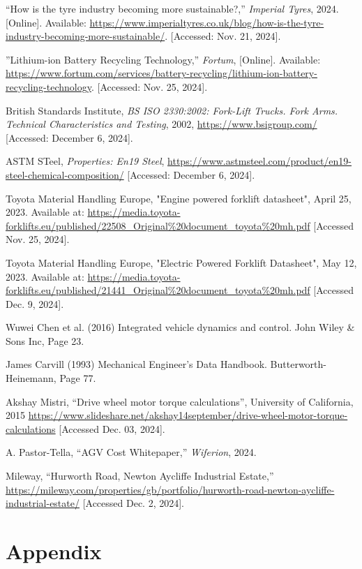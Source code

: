 \documentclass[12pt,titlepage]{article}
\begin{document}
\begin{thebibliography}{99}
``How is the tyre industry becoming more sustainable?,'' \textit{Imperial Tyres}, 2024. [Online]. Available: \url{https://www.imperialtyres.co.uk/blog/how-is-the-tyre-industry-becoming-more-sustainable/}. [Accessed: Nov. 21, 2024].

''Lithium-ion Battery Recycling Technology,''
\textit{Fortum}, [Online]. Available: \url{https://www.fortum.com/services/battery-recycling/lithium-ion-battery-recycling-technology}. [Accessed: Nov. 25, 2024].

British Standards Institute, \textit{BS ISO 2330:2002: Fork-Lift Trucks. Fork Arms. Technical Characteristics and Testing}, 2002, \url{https://www.bsigroup.com/} [Accessed: December 6, 2024].

ASTM STeel, \textit{Properties: En19 Steel}, \url{https://www.astmsteel.com/product/en19-steel-chemical-composition/} [Accessed: December 6, 2024].

Toyota Material Handling Europe, "Engine powered forklift datasheet", April 25, 2023. Available at: \url{https://media.toyota-forklifts.eu/published/22508_Original%20document_toyota%20mh.pdf} [Accessed Nov. 25, 2024].

Toyota Material Handling Europe, "Electric Powered Forklift Datasheet", May 12, 2023. Available at: \url{https://media.toyota-forklifts.eu/published/21441_Original%20document_toyota%20mh.pdf} [Accessed Dec. 9, 2024].

 Wuwei Chen et al. (2016) Integrated vehicle dynamics and control. John Wiley \& Sons Inc, Page 23.

 James Carvill (1993) Mechanical Engineer's Data Handbook. Butterworth-Heinemann, Page 77.

Akshay Mistri, “Drive wheel motor torque calculations”, University of California, 2015 \url{https://www.slideshare.net/akshay14september/drive-wheel-motor-torque-calculations} [Accessed Dec. 03, 2024].

A. Pastor-Tella, ``AGV Cost Whitepaper,'' \textit{Wiferion}, 2024.

Mileway, “Hurworth Road, Newton Aycliffe Industrial Estate,” \url{https://mileway.com/properties/gb/portfolio/hurworth-road-newton-aycliffe-industrial-estate/} [Accessed Dec. 2, 2024].

\vspace{-12pt}

\end{thebibliography}
\section{Appendix}
\vspace{-12pt}
\appendix
\renewcommand{\listfigurename}{List of Figures}
\listoffigures
 
\end{document}
